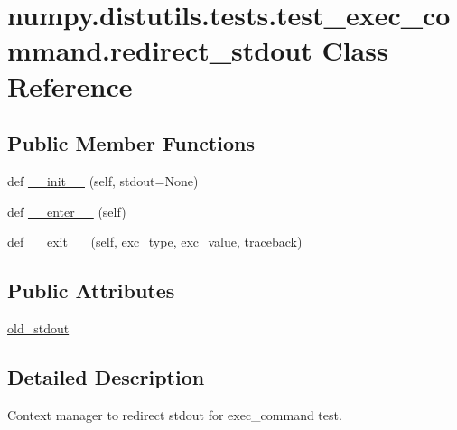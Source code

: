\hypertarget{classnumpy_1_1distutils_1_1tests_1_1test__exec__command_1_1redirect__stdout}{}\section{numpy.\+distutils.\+tests.\+test\+\_\+exec\+\_\+command.\+redirect\+\_\+stdout Class Reference}
\label{classnumpy_1_1distutils_1_1tests_1_1test__exec__command_1_1redirect__stdout}
\subsection*{Public Member Functions}
\begin{DoxyCompactItemize}
\item 
def \hyperlink{classnumpy_1_1distutils_1_1tests_1_1test__exec__command_1_1redirect__stdout_af3ce0cfc86f7d0beebdf2cd8d60db73c}{\+\_\+\+\_\+init\+\_\+\+\_\+} (self, stdout=None)
\item 
def \hyperlink{classnumpy_1_1distutils_1_1tests_1_1test__exec__command_1_1redirect__stdout_ad2f9a48fdb8c4976c265af7df26b4308}{\+\_\+\+\_\+enter\+\_\+\+\_\+} (self)
\item 
def \hyperlink{classnumpy_1_1distutils_1_1tests_1_1test__exec__command_1_1redirect__stdout_aeb45e6b946ccb638fcf75acb31fa5a76}{\+\_\+\+\_\+exit\+\_\+\+\_\+} (self, exc\+\_\+type, exc\+\_\+value, traceback)
\end{DoxyCompactItemize}
\subsection*{Public Attributes}
\begin{DoxyCompactItemize}
\item 
\hyperlink{classnumpy_1_1distutils_1_1tests_1_1test__exec__command_1_1redirect__stdout_a62794d2f9147b08b828c647bf37b893a}{old\+\_\+stdout}
\end{DoxyCompactItemize}


\subsection{Detailed Description}
\begin{DoxyVerb}Context manager to redirect stdout for exec_command test.\end{DoxyVerb}
 

